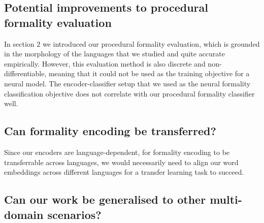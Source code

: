 \documentclass[11pt]{article}
\begin{document}
\subsection{Potential improvements to procedural formality evaluation}

In section $2$ we introduced our procedural formality evaluation, which is grounded in the morphology of the languages that we studied and quite accurate empirically. However, this evaluation method is also discrete and non-differentiable, meaning that it could not be used as the training objective for a neural model. The encoder-classifier setup that we used as the neural formality classification objective does not correlate with our procedural formality classifier well. 



\subsection{Can formality encoding be transferred?}

Since our encoders are language-dependent, for formality encoding to be transferrable across languages, we would necessarily need to align our word embeddings across different languages for a transfer learning task to succeed. 

\subsection{Can our work be generalised to other multi-domain scenarios?}



\newpage
\printbibliography
\end{document}
